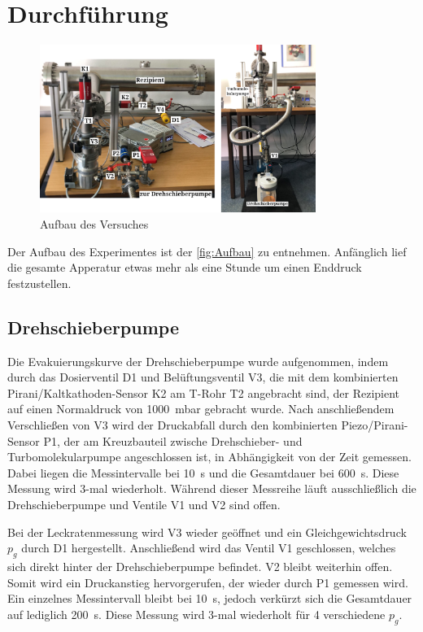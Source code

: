 \section{Durchführung}
\label{sec:Durchführung}

\begin{figure}
    \centering
    \includegraphics[width=0.8\textwidth]{abb/Aufbau.png}
    \caption{Aufbau des Versuches}
    \label{fig:Aufbau}
\end{figure}

Der Aufbau des Experimentes ist der \autoref{fig:Aufbau} zu entnehmen. Anfänglich lief die gesamte Apperatur etwas mehr als eine Stunde um einen Enddruck festzustellen.

\subsection{Drehschieberpumpe}
Die Evakuierungskurve der Drehschieberpumpe wurde aufgenommen, indem durch das Dosierventil D1 und Belüftungsventil V3, die mit dem kombinierten Pirani/Kaltkathoden-Sensor K2
am T-Rohr T2 angebracht sind, der Rezipient auf einen Normaldruck von \SI{1000}{\milli\bar} gebracht wurde. 
Nach anschließendem Verschließen von V3 wird der Druckabfall durch den kombinierten Piezo/Pirani-Sensor P1, der am Kreuzbauteil zwische
Drehschieber- und Turbomolekularpumpe angeschlossen ist, in Abhängigkeit von der Zeit gemessen.
Dabei liegen die Messintervalle bei \SI{10}{\second} und die Gesamtdauer bei \SI{600}{\second}. Diese Messung wird 3-mal wiederholt. Während dieser Messreihe
läuft ausschließlich die Drehschieberpumpe und Ventile V1 und V2 sind offen.

Bei der Leckratenmessung wird V3 wieder geöffnet und ein Gleichgewichtsdruck $p_g$ durch D1 hergestellt. Anschließend wird das Ventil V1 geschlossen, welches sich direkt hinter der
Drehschieberpumpe befindet. V2 bleibt weiterhin offen. Somit wird ein Druckanstieg hervorgerufen, der wieder durch P1 gemessen wird. Ein einzelnes Messintervall bleibt bei \SI{10}{\second},
jedoch verkürzt sich die Gesamtdauer auf lediglich \SI{200}{\second}. Diese Messung wird 3-mal wiederholt für 4 verschiedene $p_g$.

